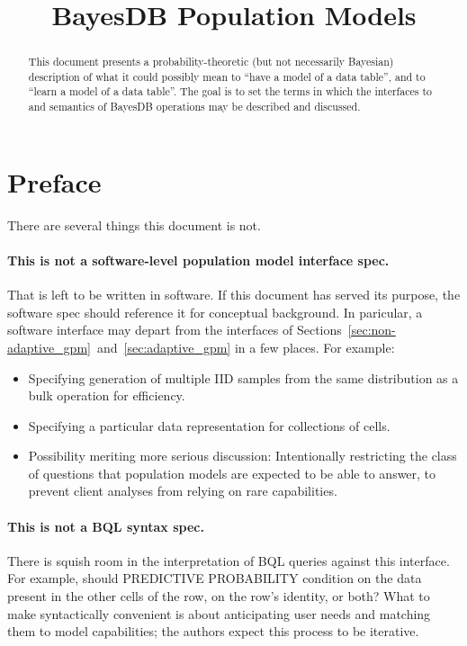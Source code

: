 \documentclass[10pt,letterpaper]{article}
\title{BayesDB Population Models}
\begin{document}
\maketitle

\begin{abstract}
This document presents a probability-theoretic (but not necessarily
Bayesian) description of what it could possibly mean to ``have a model
of a data table'', and to ``learn a model of a data table''.  The goal
is to set the terms in which the interfaces to and semantics of
BayesDB operations may be described and discussed.
\end{abstract}

\section{Preface}

There are several things this document is not.

\paragraph{This is not a software-level population model interface spec.}
That is left to be
written in software.  If this document has served its purpose, the
software spec should reference it for conceptual background.  In
paricular, a software interface may depart from the interfaces of
Sections~\ref{sec:non-adaptive_gpm}~and~\ref{sec:adaptive_gpm} in
a few places.  For example:
\begin{itemize}
\item Specifying generation of multiple IID samples from the same
  distribution as a bulk operation for efficiency.
\item Specifying a particular data representation for collections of cells.
\item Possibility meriting more serious discussion: Intentionally
  restricting the class of questions that population models are
  expected to be able to answer, to prevent client analyses from
  relying on rare capabilities.
\end{itemize}

\paragraph{This is not a BQL syntax spec.}  There is squish room
in the interpretation of BQL queries against this interface.  For
example, should PREDICTIVE PROBABILITY condition on the data present
in the other cells of the row, on the row's identity, or both?  What
to make syntactically convenient is about anticipating user needs and
matching them to model capabilities; the authors expect this process to be
iterative.
\end{document}
